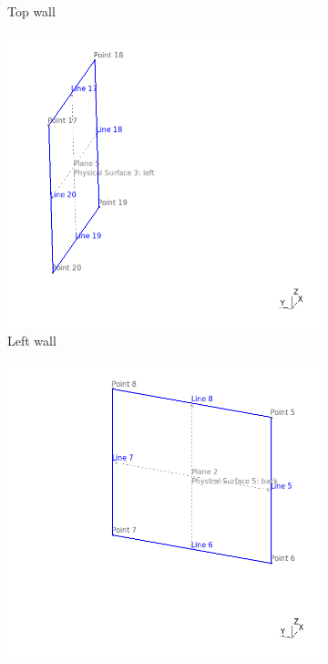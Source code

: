 \documentclass[a4]{article}
\begin{document}
\begin{figure}
\begin{subfigure}[b]{0.48\textwidth}
    \caption{Top wall}
    \label{fig:g3}
  \end{subfigure}
  \begin{subfigure}[b]{0.48\textwidth}
    \centering
    \includegraphics[width=\textwidth]{geometry_3.png}
    \caption{Left wall}
    \label{fig:g5}
  \end{subfigure}
  \hfill
  \begin{subfigure}[b]{0.48\textwidth}
    \centering
    \includegraphics[width=\textwidth]{geometry_5.png}

\end{subfigure}
\end{figure}
\end{document}
